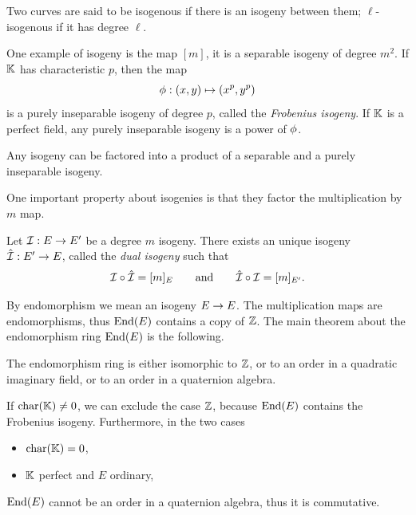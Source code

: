 Two curves are said to be isogenous if there is an isogeny between
them; $\ell$-isogenous if it has degree $\ell$.

One example of isogeny is the map $[m]$, it is a separable isogeny of
degree $m^2$. If $\mathbb{K}$ has characteristic $p$, then the map
\begin{equation}
  \label{eq:139}
  \phi : (x,y) \mapsto (x^p,y^p)
\end{equation}
is a purely inseparable isogeny of degree $p$, called the
\emph{Frobenius
  isogeny}. If $\mathbb{K}$ is a perfect field, any purely
inseparable isogeny is a power of $\phi$.

\begin{theorem}
  Any isogeny can be factored into a product of a separable and a
  purely inseparable isogeny.
\end{theorem}

One important property about isogenies is that they factor the
multiplication by $m$ map.

\begin{definition}
  Let $\mathcal{I} : E \rightarrow E'$ be a degree $m$ isogeny. There exists an
  unique isogeny $\hat{\mathcal{I}} : E' \rightarrow E$, called the
  \emph{dual isogeny} such
  that
  \[\mathcal{I}\circ\hat{\mathcal{I}} = [m]_E \qquad\text{and}\qquad \hat{\mathcal{I}}\circ\mathcal{I} =
  [m]_{E'}\text{.}\]
\end{definition}

By endomorphism we mean an isogeny $E\rightarrow E$. The multiplication maps
are endomorphisms, thus $\operatorname{End}(E)$ contains a copy of $\mathbb{Z}$.  The main
theorem about the endomorphism ring $\operatorname{End}(E)$ is the following.

\begin{theorem}
  The endomorphism ring is either isomorphic to $\mathbb{Z}$, or to an order
  in a quadratic imaginary field, or to an order in a quaternion
  algebra.
\end{theorem}

If $\operatorname{char}(\mathbb{K})\ne0$, we can exclude the case $\mathbb{Z}$, because $\operatorname{End}(E)$
contains the Frobenius isogeny. Furthermore, in the two cases
\begin{itemize}
\item $\operatorname{char}(\mathbb{K})=0$,
\item $\mathbb{K}$ perfect and $E$ ordinary,
\end{itemize}
$\operatorname{End}(E)$ cannot be an order in a quaternion algebra, thus it is
commutative.


